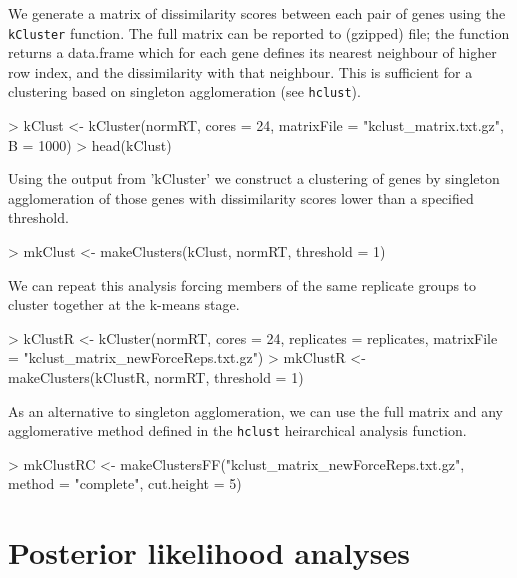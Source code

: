 \documentclass[a4paper]{article}
\begin{document}
We generate a matrix of dissimilarity scores between each pair of genes using the \verb'kCluster' function. The full matrix can be reported to (gzipped) file; the function returns a data.frame which for each gene defines its nearest neighbour of higher row index, and the dissimilarity with that neighbour. This is sufficient for a clustering based on singleton agglomeration (see \verb'hclust').

\begin{Schunk}
\begin{Sinput}
> kClust <- kCluster(normRT, cores = 24, matrixFile = "kclust_matrix.txt.gz", B = 1000)
> head(kClust)
\end{Sinput}
\end{Schunk}

Using the output from 'kCluster' we construct a clustering of genes by singleton agglomeration of those genes with dissimilarity scores lower than a specified threshold.
\begin{Schunk}
\begin{Sinput}
> mkClust <- makeClusters(kClust, normRT, threshold = 1)
\end{Sinput}
\end{Schunk}

We can repeat this analysis forcing members of the same replicate groups to cluster together at the k-means stage.

\begin{Schunk}
\begin{Sinput}
> kClustR <- kCluster(normRT, cores = 24, replicates = replicates, matrixFile = "kclust_matrix_newForceReps.txt.gz")
> mkClustR <- makeClusters(kClustR, normRT, threshold = 1)
\end{Sinput}
\end{Schunk}

As an alternative to singleton agglomeration, we can use the full matrix and any agglomerative method defined in the \verb'hclust' heirarchical analysis function.
\begin{Schunk}
\begin{Sinput}
> mkClustRC <- makeClustersFF("kclust_matrix_newForceReps.txt.gz", method = "complete", cut.height = 5)
\end{Sinput}
\end{Schunk}



\section{Posterior likelihood analyses}
         
\end{document}
